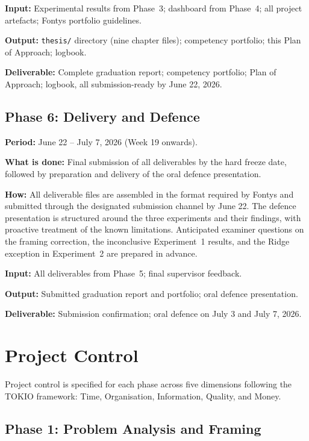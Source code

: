 \documentclass[11pt,a4paper]{article}
\begin{document}
\textbf{Input:} Experimental results from Phase~3; dashboard from Phase~4; all project artefacts; Fontys portfolio guidelines.

\textbf{Output:} \texttt{thesis/} directory (nine chapter files); competency portfolio; this Plan of Approach; logbook.

\textbf{Deliverable:} Complete graduation report; competency portfolio; Plan of Approach; logbook, all submission-ready by June 22, 2026.

\subsection{Phase 6: Delivery and Defence}

\textbf{Period:} June 22 -- July 7, 2026 (Week 19 onwards).

\textbf{What is done:} Final submission of all deliverables by the hard freeze date, followed by preparation and delivery of the oral defence presentation.

\textbf{How:} All deliverable files are assembled in the format required by Fontys and submitted through the designated submission channel by June 22. The defence presentation is structured around the three experiments and their findings, with proactive treatment of the known limitations. Anticipated examiner questions on the framing correction, the inconclusive Experiment~1 results, and the Ridge exception in Experiment~2 are prepared in advance.

\textbf{Input:} All deliverables from Phase~5; final supervisor feedback.

\textbf{Output:} Submitted graduation report and portfolio; oral defence presentation.

\textbf{Deliverable:} Submission confirmation; oral defence on July 3 and July 7, 2026.

\section{Project Control}

Project control is specified for each phase across five dimensions following the TOKIO framework: Time, Organisation, Information, Quality, and Money.

\subsection{Phase 1: Problem Analysis and Framing}
\end{document}
